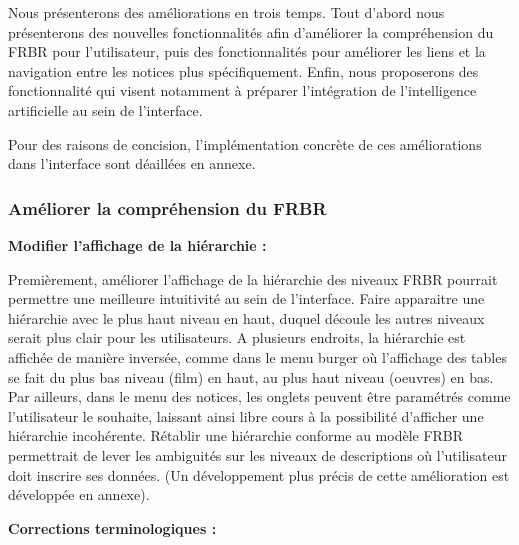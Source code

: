 Nous présenterons des améliorations en trois temps. Tout d'abord nous présenterons des nouvelles fonctionnalités afin d'améliorer la compréhension du FRBR pour l'utilisateur, puis des fonctionnalités pour améliorer les liens et la navigation entre les notices plus spécifiquement. Enfin, nous proposerons des fonctionnalité qui visent notamment à préparer l'intégration de l'intelligence artificielle au sein de l'interface. 





Pour des raisons de concision, l'implémentation concrète de ces améliorations dans l'interface sont déaillées en annexe.

\subsubsection{Améliorer la compréhension du FRBR}

\textbf{Modifier l'affichage de la hiérarchie :}

Premièrement, améliorer l'affichage de la hiérarchie des niveaux FRBR pourrait permettre une meilleure intuitivité au sein de l'interface. Faire apparaitre une hiérarchie avec le plus haut niveau en haut, duquel découle les autres niveaux serait plus clair pour les utilisateurs. A plusieurs endroits, la hiérarchie est affichée de manière inversée, comme dans le menu burger où l'affichage des tables se fait du plus bas niveau (film) en haut, au plus haut niveau (oeuvres) en bas. Par ailleurs, dans le menu des notices, les onglets peuvent être paramétrés comme l'utilisateur le souhaite, laissant ainsi libre cours à la possibilité d'afficher une hiérarchie incohérente. Rétablir une hiérarchie conforme au modèle FRBR permettrait de lever les ambiguités sur les niveaux de descriptions où l'utilisateur doit inscrire ses données. (Un développement plus précis de cette amélioration est développée en annexe). 

\textbf{Corrections terminologiques :}

